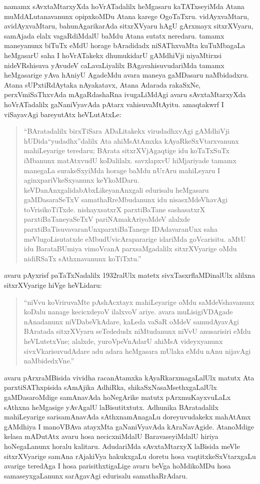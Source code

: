 namamx sAvxtaMtarxyXda hoVrATadalilx heMgasaru kaTATxseyiMda Atana muMdALutana\-vanunx opipxkoMDu Atana karege OgoTaTxru. vidAyxvaMtaru, avidAyxvaMtaru, bahunAgarikarAda sitxrXVyaru hAgU gArxmayx sitxrXVyaru, samAjada elalx vagaRdiMdalU baMdu Atana sutatx neredaru. tamamx maneyanunx biTuTx eMdU horage bAradidadx niSAThxvaMta kuTuMbagaLa heMgasarU saha I hoVrATakekx dhumukidarU gAMdhiVji niyaMtirxsi nideVRshisuva yAvudeV caLavaLiyalilx BAgavahisuvudariMda tamamx heMgasarige yAva hAniyU AgadeMdu avara maneya gaMDasaru naMbidadxru. Atana sUPxtiRdAytaka nAyakatavx, Atana Adarada rakaSxNe, perxVmiSaThxvAda mAgaRdashaRna ivugaLiMdAgi avaru sAvxtaMtarxyXda hoVrATadalilx gaNaniVyavAda pAtarx vahisuvaMtAyitu. amaqtakwrf I viSayavAgi bareyutAtx heVLutAtxLe:
\begin{quote}
``BAratadalilx birxTiSara ADaLitakekx virudadhxvAgi gAMdhiVji hUDida\break ``yudadhx''dalilx Ata ahiMsAtAmxka kAyaRkeSxVtarxvanunx mahiLeyarige tere\-daru; BArata sitxrXVjAgaqtige idu koTaTxSuTx iMbanunx matAtxvudU koDa\-lilalx. savxlapxvU hiMjariyade tamamx manegaLa surakeSxyiMda horage baMdu nUrAru mahiLeyaru I aginxpariVkeSxyanunx keYkoMDaru. keVDanAnxgali\break dabAbxLikeyanAnxgali edurisalu heMgasaru gaMDasaraSeTxV samathaR\-reMbu\-danunx idu nisasxMdeVhavAgi toVrisikoTiTxde. nishayxsatxrX parxtiBaTane sashasatxrX parxtiBaTaneyaSeTxV pariNAmakAriyoMdeV alalxde parxtiBaTisuvavaranUnx\break parxtiBaTanege IDAdavaranUnx saha meVlugoLisutatxde eMbudU\break vicArapararige idariMda goVcarisitu. aMtU idu BarataBUmiya vimoVcanA parxsaMgadalilx sitxrXVyarige oMdu nidiRSaTx sAthxnavanunx koTiTxtu.''
\end{quote}

avaru pAyxrisf paTaTxNadalilx {\rm 1932}ralUlx matetx sivxTasxrflaMDinalUlx alilxna sitxrXVyarige hiVge heVLidaru:
\begin{quote}
``niVvu koVriruvaMte pAshAcxtayx mahiLeyarige oMdu saMdeVshavanunx koDalu nanage kecicxdeyoV ilalxvoV ariye. avara muLisigiVDAgade nAnadanunx niVDabeVkAdare, kaLeda vaSaR oMdeV samudAyavAgi BAratada sitxrXVyaru seTededudx niMtudanunx niVvU anusarisiri eMdu heVLutetxVne; alalxde, yuroVpeVnAdarU ahiMsA videyxyanunx sivxVkarisuvudAdare adu adara heMgasara mUlaka eMdu nAnu nijavAgi naMbidedxVne.''
\end{quote}

avaru pArxraMBisida vividha racanAtamxka kAyaRkarxmagaLalUlx matutx Ata parxtiSAThxpisida sAmAjika AdhiRka, shikaSxNasaMsethxgaLalUlx gaMDasaroMdige samAnavAda hoNegArike matutx pArxmuKayxvuLaLx sAthxna heMgasige yAvAgalU laBisutitxtutx. Adhunika BAratadalilx mahiLeyarige sarisamAnavAda sAthxnamAnagaLu doreyuvudakekx mahAtAmx gAMdhiya I manoVBAva atayxMta gaNaniVyavAda kAraNavAgide. AtanoMdige kelasa mADutAtx avaru hosa necicxniMdalU BaravaseyiMdalU hiriya hoNegaLanunx horalu kalitaru. AdudariMda sAvxtaMtarxyX laBisida meVle sitxrXVyarige samAna rAjakiVya hakukxgaLu doretu hosa vaqtitxkeSxVtarxgaLu avarige teredAga I hosa parisithxtigaLige avaru beVga hoMdikoMDu hosa samaseyxgaLanunx sarAgavAgi edurisalu samathaRrAdaru.

